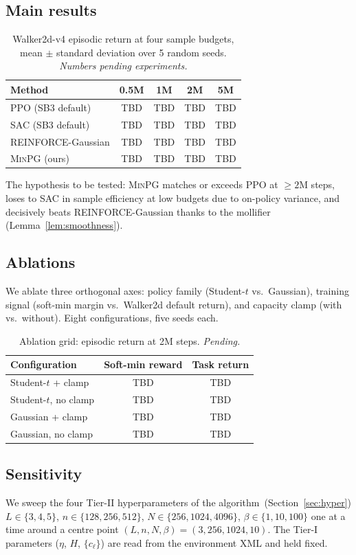\subsection{Main results}
\label{sec:exp-main}

\begin{table}[h]
\centering
\caption{Walker2d-v4 episodic return at four sample budgets, mean
$\pm$ standard deviation over 5 random seeds. \emph{Numbers pending
experiments.}}
\label{tab:main}
\begin{tabular}{lcccc}
\toprule
Method & 0.5M & 1M & 2M & 5M \\
\midrule
PPO (SB3 default) & TBD & TBD & TBD & TBD \\
SAC (SB3 default) & TBD & TBD & TBD & TBD \\
REINFORCE-Gaussian & TBD & TBD & TBD & TBD \\
\textsc{MinPG} (ours) & TBD & TBD & TBD & TBD \\
\bottomrule
\end{tabular}
\end{table}

The hypothesis to be tested: \textsc{MinPG} matches or exceeds PPO at
$\ge\!2$M steps, loses to SAC in sample efficiency at low budgets due
to on-policy variance, and decisively beats REINFORCE-Gaussian thanks
to the mollifier (Lemma~\ref{lem:smoothness}).

\subsection{Ablations}
\label{sec:exp-abl}

We ablate three orthogonal axes: policy family (Student-$t$ vs.\
Gaussian), training signal (soft-min margin vs.\ Walker2d default
return), and capacity clamp (with vs.\ without). Eight configurations,
five seeds each.

\begin{table}[h]
\centering
\caption{Ablation grid: episodic return at 2M steps. \emph{Pending.}}
\label{tab:ablation}
\begin{tabular}{lcc}
\toprule
Configuration & Soft-min reward & Task return \\
\midrule
Student-$t$ + clamp & TBD & TBD \\
Student-$t$, no clamp & TBD & TBD \\
Gaussian + clamp & TBD & TBD \\
Gaussian, no clamp & TBD & TBD \\
\bottomrule
\end{tabular}
\end{table}

\subsection{Sensitivity}
\label{sec:exp-sens}

We sweep the four Tier-II hyperparameters of the
algorithm~(Section~\ref{sec:hyper})
$L \in \{3, 4, 5\}$, $n \in \{128, 256, 512\}$,
$N \in \{256, 1024, 4096\}$, $\beta \in \{1, 10, 100\}$
one at a time around a centre point $(L, n, N, \beta) =
(3, 256, 1024, 10)$. The Tier-I parameters
($\eta$, $H$, $\{c_\ell\}$) are read from the environment XML and
held fixed.
